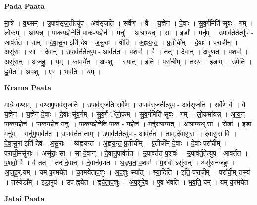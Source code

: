 \documentclass[17pt]{extarticle}
\begin{document}
\textbf{Pada Paata} \newline

मा॒त्रे । व॒थ्सम् । उ॒पाव॑सृज॒तीत्यु॑प - अव॑सृजति । सर्वे॑ण । वै । य॒ज्ञेन॑ । दे॒वाः । सु॒व॒र्गमिति॑ सुवः - गम् । लो॒कम् । आ॒य॒न्न् । पा॒क॒य॒ज्ञेनेति॑ पाक-य॒ज्ञेन॑ । मनुः॑ । अ॒श्रा॒म्य॒त् । सा । इडा᳚ । मनु᳚म् । उ॒पाव॑र्त॒तेत्यु॑प - आव॑र्तत । ताम् । दे॒वा॒सु॒रा इति॑ देव - अ॒सु॒राः । वीति॑ । अ॒ह्व॒य॒न्त॒ । प्र॒तीची᳚म् । दे॒वाः । परा॑चीम् । असु॑राः । सा । दे॒वान् । उ॒पाव॑र्त॒तेत्यु॑प - आव॑र्तत । प॒शवः॑ । वै । तत् । दे॒वान् । अ॒वृ॒ण॒त॒ । प॒शवः॑ । असु॑रान् । अ॒ज॒हुः॒ । यम् । का॒मये॑त । अ॒प॒शुः । स्या॒त् । इति॑ । परा॑चीम् । तस्य॑ । इडा᳚म् । उपेति॑ । ह्व॒ये॒त॒ । अ॒प॒शुः । ए॒व । भ॒व॒ति॒ । यम् ।  \newline


\textbf{Krama Paata} \newline

मा॒त्रे व॒थ्सम् । व॒थ्समु॒पाव॑सृजति । उ॒पाव॑सृजति॒ सर्वे॑ण । उ॒पाव॑सृज॒तीत्यु॑प - अव॑सृजति । सर्वे॑ण॒ वै । वै य॒ज्ञेन॑ । य॒ज्ञेन॑ दे॒वाः । दे॒वाः सु॑व॒र्गम् । सु॒व॒र्गं ॅलो॒कम् । सु॒व॒र्गमिति॑ सुवः - गम् । लो॒कमा॑यन्न् । आ॒य॒न् पा॒क॒य॒ज्ञेन॑ । पा॒क॒य॒ज्ञेन॒ मनुः॑ । पा॒क॒य॒ज्ञेनेति॑ पाक - य॒ज्ञेन॑ । मनु॑रश्राम्यत् । अ॒श्रा॒म्य॒थ् सा । सेडा᳚ । इडा॒ मनु᳚म् । मनु॑मु॒पाव॑र्तत । उ॒पाव॑र्तत॒ ताम् । उ॒पाव॑र्त॒तेत्यु॑प - आव॑र्तत । ताम्,दे॑वासु॒राः । दे॒वा॒सु॒रा वि । दे॒वा॒सु॒रा इति॑ देव - अ॒सु॒राः । व्य॑ह्वयन्त । अ॒ह्व॒य॒न्त॒ प्र॒तीची᳚म् । प्र॒तीची᳚म् दे॒वाः । दे॒वाः परा॑चीम् । परा॑ची॒मसु॑राः । असु॑राः॒ सा । सा दे॒वान् । दे॒वानु॒पाव॑र्तत । उ॒पाव॑र्तत प॒शवः॑ । उ॒पाव॑र्त॒तेत्यु॑प - आव॑र्तत । प॒शवो॒ वै । वै तत् । तद् दे॒वान् । दे॒वान॑वृणत । अ॒वृ॒ण॒त॒ प॒शवः॑ । प॒शवो ऽसु॑रान् । असु॑रानजहुः । अ॒ज॒हु॒र्,यम् । यम् का॒मये॑त । का॒मये॑ताप॒शुः । अ॒प॒शुः स्या᳚त् । स्या॒दिति॑ । इति॒ परा॑चीम् । परा॑ची॒म् तस्य॑ । तस्येडा᳚म् । इडा॒मुप॑ । उप॑ ह्वयेत । ह्व॒ये॒ता॒प॒शुः । अ॒प॒शुरे॒व । ए॒व भ॑वति । भ॒व॒ति॒ यम् । यम् का॒मये॑त \newline

\textbf{Jatai Paata} \newline
\end{document}
